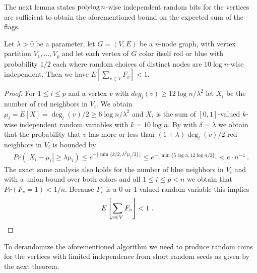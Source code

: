 The next lemma states $\operatorname{polylog} n$-wise independent random bits for the vertices are sufficient to obtain the aforementioned bound on the expected sum of the flags. 
\begin{lemma}
\label{lem:limIndProcess}
Let $\lambda>0$ be a parameter, let $G=(V,E)$ be a $n$-node graph, with vertex partition $V_1,\ldots,V_p$ and 
let each vertex of $G$ color itself red or blue with probability $1/2$ each where random choices of distinct nodes are $10\log n$-wise independent. 
Then we have $E[\sum_{v\in V}F_v]<1$. 
\end{lemma}

\begin{proof}
For $1\leq i\leq p$ and a vertex $v$ with  $deg_i(v)\geq 12\log n/\lambda^2$ let $X_i$ be the number of red neighbors in $V_i$. We obtain $\mu_i=E[X]=\deg_i(v)/2\geq 6\log n /\lambda^2$ and $X_i$ is the sum of $[0,1]$-valued $k$-wise independent random variables with $k=10\log n$. 
By  with $\delta=\lambda$ we obtain that the probability that $v$ has more or less than $(1\pm\lambda)\deg_i(v)/2$ red neighbors in $V_i$ is bounded by
\begin{align}
Pr(|X_i-\mu_i|\geq \lambda\mu_i)\leq e^{-\lfloor \min\{k/2,\lambda^2\mu_i/3\}\rfloor} \leq e^{-\lfloor \min\{5\log n,12\log n/3\}\rfloor}< e\cdot n^{-4}~.
\end{align}
The exact same analysis also holds for the number of blue neighbors in $V_i$ and with a union bound over both colors and all $1\leq i\leq p< n$ we obtain that $Pr(F_v=1)< 1/n$. 
Because $F_v$ is a $0$ or $1$ valued random variable this implies 
\begin{align*}
    E\left[\sum_{v\in V}F_v\right]<1~.  & & \qedhere
\end{align*}
\end{proof}

To derandomize the aforementioned algorithm we need to produce random coins for the vertices with limited independence from short random seeds as given by the next theorem.

